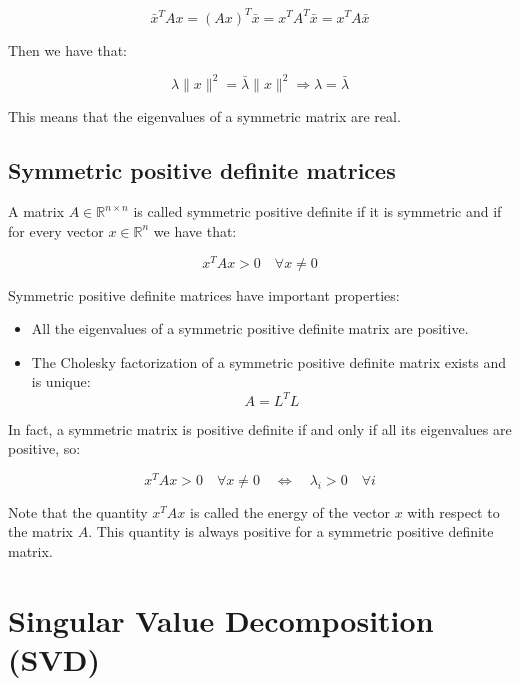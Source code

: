 \begin{equation}
    \bar{x}^T A x = (A x)^T \bar{x} = x^T A^T \bar{x} = x^T A \bar{x}
\end{equation}

Then we have that:

\begin{equation}
    \lambda \|x\|^2 = \bar{\lambda} \|x\|^2 \Rightarrow \lambda = \bar{\lambda}
\end{equation}

This means that the eigenvalues of a symmetric matrix are real.

\subsection{Symmetric positive definite matrices}

A matrix $A \in \mathbb{R}^{n \times n}$ is called symmetric positive definite if it is symmetric and if for every vector $x \in \mathbb{R}^n$
we have that:

\begin{equation}
    x^T A x > 0 \quad \forall x \neq 0
\end{equation}

Symmetric positive definite matrices have important properties:

\begin{itemize}
    \item All the eigenvalues of a symmetric positive definite matrix are positive.
    \item The Cholesky factorization of a symmetric positive definite matrix exists and is unique:
    \begin{equation}
        A = L^T L
    \end{equation}
\end{itemize}

In fact, a symmetric matrix is positive definite if and only if all its eigenvalues are positive, so:

\begin{equation}
    x^T A x > 0 \quad \forall x \neq 0 \quad \Leftrightarrow \quad \lambda_i > 0 \quad \forall i
\end{equation}

Note that the quantity $x^T A x$ is called the energy of the vector $x$ with respect to the matrix $A$. This quantity is always positive
for a symmetric positive definite matrix.\\


\section{Singular Value Decomposition (SVD)}

